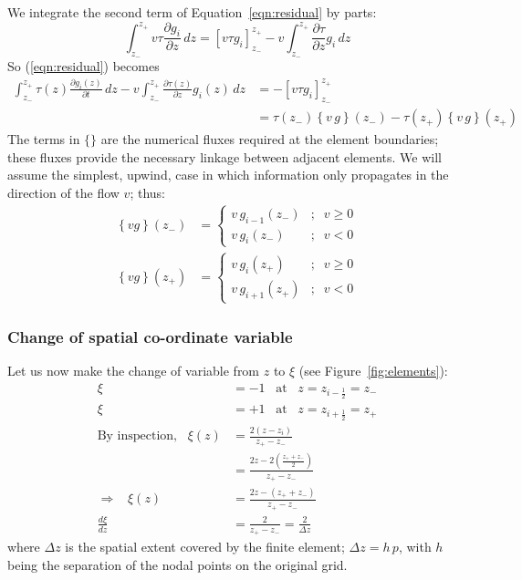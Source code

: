 \documentclass[10pt,a4paper]{article}
\newcommand{\dd}{\partial}
\begin{document}
We integrate the second term of Equation~\ref{eqn:residual} by parts:
\[
\int_{z_-}^{z_+} v \tau \frac{\dd g_i}{\dd z} \, dz = \left[ v \tau g_i
\right]_{z_-}^{z_+} - v \int_{z_-}^{z_+} \frac{\dd \tau}{\dd z} g_i \, dz
\]
So (\ref{eqn:residual}) becomes
\begin{align}
\int_{z_-}^{z_+} \tau(z) \frac{\dd g_i(z)}{\dd t} \, dz - v \int_{z_-}^{z_+}
\frac{\dd \tau(z)}{\dd z} g_i(z) \, dz & = -\left[ v \tau g_i
\right]_{z_-}^{z_+}
\label{eqn:intbyparts} \\
& = \tau(z_-)\left\{ v\,g \right\}(z_-) - \tau(z_+)\left\{ v\,g
\right\}(z_+) \nonumber
\end{align}
The terms in $\{\}$ are the numerical fluxes required at the element
boundaries; these fluxes provide the necessary linkage between adjacent
elements. We will assume the simplest, upwind, case in which information only
propagates in the direction of the flow $v$; thus:
\begin{align*}
\left\{ vg \right\}(z_-) & = \left\{
\begin{array}{lc}
v \, g_{i-1}(z_-) & ; \;\; v \geq 0 \\
v \, g_{i}(z_-) & ; \;\; v < 0
\end{array}
\right. \\
\left\{ vg \right\}(z_+) & = \left\{
\begin{array}{lc}
v \, g_{i}(z_+) & ; \;\; v \geq 0 \\
v \, g_{i+1}(z_+) & ; \;\; v < 0
\end{array}
\right.
\end{align*}

\subsubsection{Change of spatial co-ordinate variable}
\label{sec:spatialvarchange}

Let us now make the change of variable from $z$ to $\xi$ (see
Figure~\ref{fig:elements}):
\begin{align*}
\xi & = -1 \;\;\; \mbox{at} \;\;\; z = z_{i-\frac{1}{2}} = z_- \\
\xi & = +1 \;\;\; \mbox{at} \;\;\; z = z_{i+\frac{1}{2}} = z_+ \\
\mbox{By inspection,} \;\;\; \xi(z) & = \frac{2(z-z_i)}{z_+ - z_-} \\
& = \frac{2z - 2 \left(\frac{z_+ + z_-}{2}\right)}{z_+ - z_-} \\
\Longrightarrow \;\;\; \xi(z) & = \frac{2z - (z_+ + z_-)}{z_+ - z_-} \\
\frac{d\xi}{dz} & = \frac{2}{z_+ - z_-} = \frac{2}{\Delta z}
\end{align*}
where $\Delta z$ is the spatial extent covered by the finite element; $\Delta
z = h\,p$, with $h$ being the separation of the nodal points on the original
grid.
\end{document}
